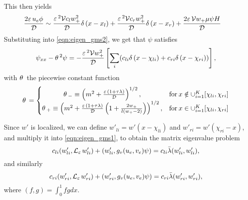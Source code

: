This then yields
% 
\begin{equation*}
\begin{split}
\begin{aligned}
\frac{2\varepsilon\, u_e\phi}{\mathcal{D}}&\sim \frac{\varepsilon\,^2\mathcal{V} c_lw_+^2}{\mathcal{D}}\delta\,(x-x_l) +\frac{\varepsilon\,^2\mathcal{V} c_rw_+^2}{\mathcal{D}}\delta\,(x-x_r) + \frac{2\varepsilon\,\mathcal{V} w_+\mu\psi H}{\mathcal{D}}
\end{aligned}
\end{split}
\end{equation*}
% 
Substituting into \eqref{eqn:eigen_gms2}, we get that $\psi$ satisfies
% 
\begin{equation}
\label{eqn:phi_main2}
\begin{split}
\begin{aligned}
\psi_{xx}-\theta\,^2\psi = -\frac{\varepsilon\,^2\mathcal{V} w_+^2}{\mathcal{D}}\left[\sum_i(c_{li}\delta\,(x-\chi_{li}) + c_{ri}\delta\,(x-\chi_{ri})) \right],
\end{aligned}
\end{split}
\end{equation}
% 
with $\theta\,$ the piecewise constant function
% 
\begin{equation}
\label{eqn:phi_asym}
	\begin{split}
	\theta\,
   = \left\{
	\begin{matrix}
		\theta\,_-\equiv\left(m^2+\frac{\varepsilon\,(1+\tau\lambda)}{\mathcal{D}}\right)^{1/2},& \mathrm{for}\hspace{2pt} x\notin\cup_{i=1}^K[\chi_{li},\chi_{ri}]\\
		\theta\,_+\equiv\left(m^2+\frac{\varepsilon\,(1+\tau\lambda)}{\mathcal{D}}\left(1+\frac{2w_+}{l(w_+-2)} \right)\right)^{1/2},& \mathrm{for}\hspace{2pt} x\in\cup_{i=1}^K[\chi_{li},\chi_{ri}]
	\end{matrix}\right.
	\end{split}
\end{equation}
% 

Since $w'$ is localized, we can define $w'_{li}=w'(x-\chi_{li})$ and $w'_{ri}=w'(\chi_{ri}-x)$, and multiply it into \eqref{eqn:eigen_gms1}, to obtain the matrix eigenvalue problem
% 
\begin{equation}
\label{eqn:matrix_eigen_l}
  c_{li}(w'_{li},\mathcal{L}_{\varepsilon\,}w'_{li}) + (w'_{li},g_v(u_e,v_e)\psi) = c_{li}\bar{\lambda}(w'_{li},w'_{li}),
\end{equation}
% 
and similarly
% 
\begin{equation}
\label{eqn:matrix_eigen_r}
  c_{ri}(w'_{ri},\mathcal{L}_{\varepsilon\,}w'_{ri}) + (w'_{ri},g_v(u_e,v_e)\psi) = c_{ri}\bar{\lambda}(w'_{ri},w'_{ri}),
\end{equation}
% 
where $(f,g) = \int_0^1fgdx$.

